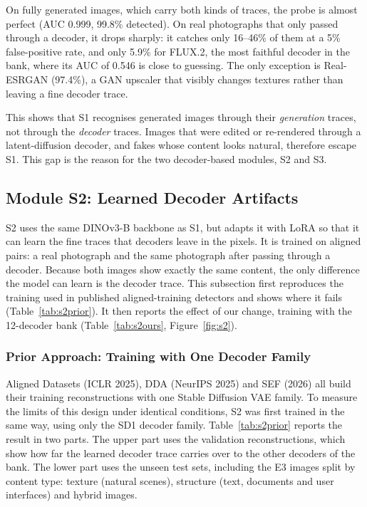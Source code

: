 On fully generated images, which carry both kinds of traces, the probe is almost perfect (AUC 0.999, 99.8\% detected). On real photographs that only passed through a decoder, it drops sharply: it catches only 16--46\% of them at a 5\% false-positive rate, and only 5.9\% for FLUX.2, the most faithful decoder in the bank, where its AUC of 0.546 is close to guessing. The only exception is Real-ESRGAN (97.4\%), a GAN upscaler that visibly changes textures rather than leaving a fine decoder trace.

This shows that S1 recognises generated images through their \textit{generation} traces, not through the \textit{decoder} traces. Images that were edited or re-rendered through a latent-diffusion decoder, and fakes whose content looks natural, therefore escape S1. This gap is the reason for the two decoder-based modules, S2 and S3.

\subsection{Module S2: Learned Decoder Artifacts}
\label{sec:res_s2}

S2 uses the same DINOv3-B backbone as S1, but adapts it with LoRA so that it can learn the fine traces that decoders leave in the pixels. It is trained on aligned pairs: a real photograph and the same photograph after passing through a decoder. Because both images show exactly the same content, the only difference the model can learn is the decoder trace. This subsection first reproduces the training used in published aligned-training detectors and shows where it fails (Table~\ref{tab:s2prior}). It then reports the effect of our change, training with the 12-decoder bank (Table~\ref{tab:s2ours}, Figure~\ref{fig:s2}).

\subsubsection{Prior Approach: Training with One Decoder Family}

Aligned Datasets (ICLR 2025), DDA (NeurIPS 2025) and SEF (2026) all build their training reconstructions with one Stable Diffusion VAE family. To measure the limits of this design under identical conditions, S2 was first trained in the same way, using only the SD1 decoder family. Table~\ref{tab:s2prior} reports the result in two parts. The upper part uses the validation reconstructions, which show how far the learned decoder trace carries over to the other decoders of the bank. The lower part uses the unseen test sets, including the E3 images split by content type: texture (natural scenes), structure (text, documents and user interfaces) and hybrid images.

